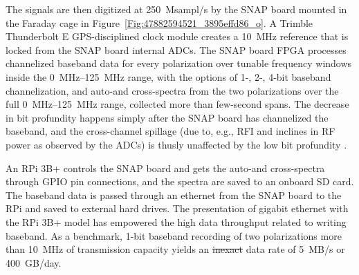 The signals are then digitized at \SI{250}{Msampl/s} by the SNAP board mounted in the Faraday cage in Figure~\ref{Fig:47882594521_3895effd86_o}. A Trimble Thunderbolt E GPS-disciplined clock module  creates a \SI{10}{\mega\hertz} reference that is locked from the SNAP board internal ADCs. The SNAP board FPGA processes channelized baseband data for every polarization over tunable frequency windows inside the \SIrange{0}{125}{\mega\hertz} range, with the options of 1-, 2-, 4-bit baseband channelization, and auto-and cross-spectra from the two polarizations over the full \SIrange{0}{125}{\mega\hertz} range, collected more than few-second spans.  The decrease in bit profundity happens simply after the SNAP board has channelized the baseband, and the cross-channel spillage (due to, e.g., RFI and inclines in RF power as observed by the ADCs) is thusly unaffected by the low bit profundity . 

An RPi 3B+ controls the SNAP board and gets the auto-and cross-spectra through GPIO pin connections, and the spectra are saved to an onboard SD card. The baseband data is passed through an ethernet from the SNAP board to the RPi and saved to external hard drives. The presentation of gigabit ethernet with the RPi 3B+ model has empowered the high data throughput related to writing baseband. As a benchmark, 1-bit baseband recording of two polarizations more than \SI{10}{\mega\hertz} of transmission capacity yields an \st{inexact}  data rate of 5~MB/s or 400~GB/day.  

